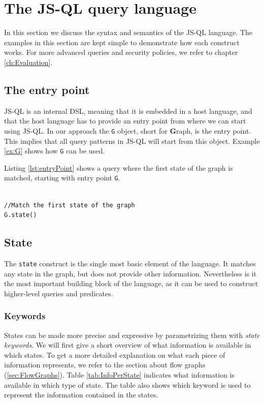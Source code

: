 \section{The JS-QL query language}
\label{sec:Syntax}
 In this section we discuss the syntax and semantics of the JS-QL language. The examples in this section are kept simple to demonstrate how each construct works. For more advanced queries and security policies, we refer to chapter \ref{ch:Evaluation}.

\subsection{The entry point}
JS-QL is an internal DSL, meaning that it is embedded in a host language, and that the host language has to provide an entry point from where we can start using JS-QL. In our approach the \texttt{G} object, short for \textbf{G}raph, is the entry point. This implies that all query patterns in JS-QL will start from this object. Example \ref{ex:G} shows how \texttt{G} can be used.

\begin{exmp}
\label{ex:G}
Listing \ref{lst:entryPoint} shows a query where the first state of the graph is matched, starting with entry point \texttt{G}.

\begin{lstlisting}[label={lst:entryPoint},language=JSQL,caption=Matching the first state starting from entry point \texttt{G},mathescape=true]  % float=t?

//Match the first state of the graph
G.state()
\end{lstlisting}
\end{exmp}

\subsection{State}
The \texttt{state} construct is the single most basic element of the language. It matches any state in the graph, but does not provide other information. Nevertheless is it the most important building block of the language, as it can be used to construct higher-level queries and predicates. 

\subsubsection*{Keywords}
States can be made more precise and expressive by parametrizing them with \textit{state keywords}. We will first give a short overview of what information is available in which states. To get a more detailed explanation on what each piece of information represents, we refer to the section about flow graphs (\ref{sec:FlowGraphs}). Table \ref{tab:InfoPerState} indicates what information is available in which type of state. The table also shows which keyword is used to represent the information contained in the states.


